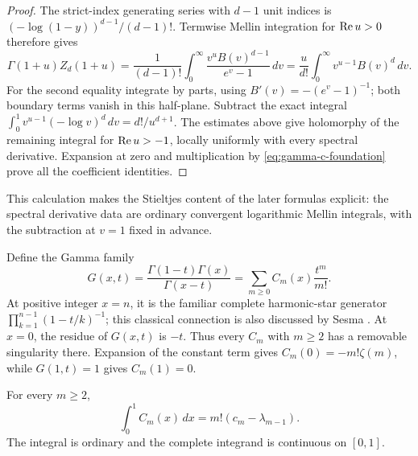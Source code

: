 \begin{proof}
The strict-index generating series with $d-1$ unit indices is
$(-\log(1-y))^{d-1}/(d-1)!$. Termwise Mellin integration for
$\operatorname{Re} u>0$ therefore gives
\[
 \Gamma(1+u)Z_d(1+u)
  =\frac1{(d-1)!}\int_0^\infty
            \frac{v^u B(v)^{d-1}}{e^v-1}\,dv
  =\frac{u}{d!}\int_0^\infty v^{u-1}B(v)^d\,dv.
\]
For the second equality integrate by parts, using
$B'(v)=-(e^v-1)^{-1}$; both boundary terms vanish in this half-plane.
Subtract the exact integral
$\int_0^1v^{u-1}(-\log v)^d\,dv=d!/u^{d+1}$.
The estimates above give holomorphy of the remaining integral for
$\operatorname{Re} u>-1$, locally uniformly with every spectral derivative.
Expansion at zero and multiplication by \eqref{eq:gamma-c-foundation}
prove all the coefficient identities.
\end{proof}

This calculation makes the Stieltjes content of the later formulas
explicit: the spectral derivative data are ordinary convergent logarithmic
Mellin integrals, with the subtraction at $v=1$ fixed in advance.

Define the Gamma family
\begin{equation}\label{eq:Cgamma-foundation}
 G(x,t)=\frac{\Gamma(1-t)\Gamma(x)}{\Gamma(x-t)}
       =\sum_{m\ge0}C_m(x)\frac{t^m}{m!}.
\end{equation}
At positive integer $x=n$, it is the familiar complete harmonic-star
generator $\prod_{k=1}^{n-1}(1-t/k)^{-1}$; this classical connection
is also discussed by Sesma \cite{Sesma}. At $x=0$, the residue of
$G(x,t)$ is $-t$. Thus every $C_m$ with $m\ge2$ has a removable
singularity there. Expansion of the constant term gives
$C_m(0)=-m!\zeta(m)$, while $G(1,t)=1$ gives $C_m(1)=0$.

\begin{proposition}
\label{prop:Cgamma-integral-foundation}
For every $m\ge2$,
\begin{equation}\label{eq:Cgamma-integral-foundation}
 \int_0^1C_m(x)\,dx=m!(c_m-\lambda_{m-1}).
\end{equation}
The integral is ordinary and the complete integrand is continuous on
$[0,1]$.
\end{proposition}

